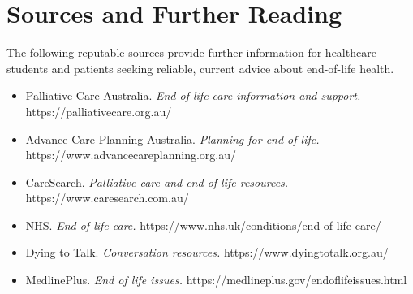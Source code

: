\section*{Sources and Further Reading}
The following reputable sources provide further information for healthcare students and patients seeking reliable, current advice about end-of-life health.
\begin{itemize}
    \item Palliative Care Australia. \textit{End-of-life care information and support.} https://palliativecare.org.au/
    \item Advance Care Planning Australia. \textit{Planning for end of life.} https://www.advancecareplanning.org.au/
    \item CareSearch. \textit{Palliative care and end-of-life resources.} https://www.caresearch.com.au/
    \item NHS. \textit{End of life care.} https://www.nhs.uk/conditions/end-of-life-care/
    \item Dying to Talk. \textit{Conversation resources.} https://www.dyingtotalk.org.au/
    \item MedlinePlus. \textit{End of life issues.} https://medlineplus.gov/endoflifeissues.html
\end{itemize}
